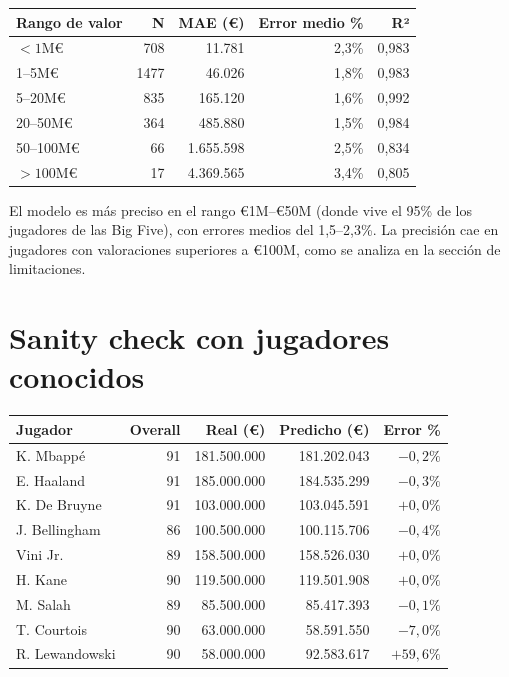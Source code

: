 \documentclass[12pt,a4paper]{report}
\begin{document}
\begin{center}
\begin{tabular}{lrrrr}
\toprule
\textbf{Rango de valor} & \textbf{N} & \textbf{MAE (€)} & \textbf{Error medio \%} & \textbf{R²} \\
\midrule
$< 1$M€      & 708  & 11.781   & 2{,}3\% & 0{,}983 \\
1--5M€       & 1477 & 46.026   & 1{,}8\% & 0{,}983 \\
5--20M€      & 835  & 165.120  & 1{,}6\% & 0{,}992 \\
20--50M€     & 364  & 485.880  & 1{,}5\% & 0{,}984 \\
50--100M€    & 66   & 1.655.598 & 2{,}5\% & 0{,}834 \\
$> 100$M€    & 17   & 4.369.565 & 3{,}4\% & 0{,}805 \\
\bottomrule
\end{tabular}
\end{center}

El modelo es más preciso en el rango €1M--€50M (donde vive el 95\% de los jugadores de las Big Five), con errores medios del 1{,}5--2{,}3\%. La precisión cae en jugadores con valoraciones superiores a €100M, como se analiza en la sección de limitaciones.

\section{Sanity check con jugadores conocidos}

\begin{center}
\begin{tabular}{lrrrr}
\toprule
\textbf{Jugador} & \textbf{Overall} & \textbf{Real (€)} & \textbf{Predicho (€)} & \textbf{Error \%} \\
\midrule
K. Mbappé      & 91 & 181.500.000 & 181.202.043 & $-0{,}2\%$ \\
E. Haaland     & 91 & 185.000.000 & 184.535.299 & $-0{,}3\%$ \\
K. De Bruyne   & 91 & 103.000.000 & 103.045.591 & $+0{,}0\%$ \\
J. Bellingham  & 86 & 100.500.000 & 100.115.706 & $-0{,}4\%$ \\
Vini Jr.       & 89 & 158.500.000 & 158.526.030 & $+0{,}0\%$ \\
H. Kane        & 90 & 119.500.000 & 119.501.908 & $+0{,}0\%$ \\
M. Salah       & 89 & 85.500.000  & 85.417.393  & $-0{,}1\%$ \\
T. Courtois    & 90 & 63.000.000  & 58.591.550  & $-7{,}0\%$ \\
R. Lewandowski & 90 & 58.000.000  & 92.583.617  & $+59{,}6\%$ \\
\bottomrule
\end{tabular}
\end{center}
\end{document}
